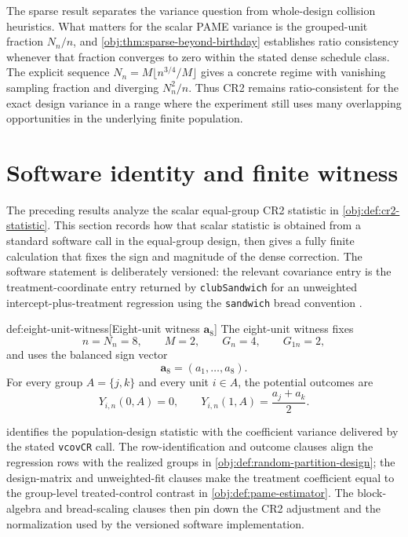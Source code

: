 \documentclass[11pt]{article}
\begin{document}
The sparse result separates the variance question from whole-design collision heuristics. What matters for the scalar PAME variance is the grouped-unit fraction \(N_n/n\), and \cref{obj:thm:sparse-beyond-birthday} establishes ratio consistency whenever that fraction converges to zero within the stated dense schedule class. The explicit sequence \(N_n=M\lfloor n^{3/4}/M\rfloor\) gives a concrete regime with vanishing sampling fraction and diverging \(N_n^2/n\). Thus CR2 remains ratio-consistent for the exact design variance in a range where the experiment still uses many overlapping opportunities in the underlying finite population.


\section{Software identity and finite witness}\label{sec:software-witness}

The preceding results analyze the scalar equal-group CR2 statistic in \cref{obj:def:cr2-statistic}. This section records how that scalar statistic is obtained from a standard software call in the equal-group design, then gives a fully finite calculation that fixes the sign and magnitude of the dense correction. The software statement is deliberately versioned: the relevant covariance entry is the treatment-coordinate entry returned by \texttt{clubSandwich} for an unweighted intercept-plus-treatment regression using the \texttt{sandwich} bread convention \citep{ClubSandwich2026,Sandwich2026,Zeileis2004,Zeileis2006,ZeileisKollGraham2020,PustejovskyTipton2018}.

\begin{definitionv}{def:eight-unit-witness}[Eight-unit witness $\mathbf a_8$]
The eight-unit witness fixes
\[
n=N_n=8,\qquad
M=2,\qquad
G_n=4,\qquad
G_{1n}=2,
\]
and uses the balanced sign vector
\[
\mathbf a_8=(a_1,\ldots,a_8).
\]
For every group \(A=\{j,k\}\) and every unit \(i\in A\), the potential outcomes are
\[
Y_{i,n}(0,A)=0,
\qquad
Y_{i,n}(1,A)=\frac{a_j+a_k}{2}.
\]
\end{definitionv}

 identifies the population-design statistic with the coefficient variance delivered by the stated \texttt{vcovCR} call. The row-identification and outcome clauses align the regression rows with the realized groups in \cref{obj:def:random-partition-design}; the design-matrix and unweighted-fit clauses make the treatment coefficient equal to the group-level treated-control contrast in \cref{obj:def:pame-estimator}. The block-algebra and bread-scaling clauses then pin down the CR2 adjustment and the normalization used by the versioned software implementation.
\end{document}
